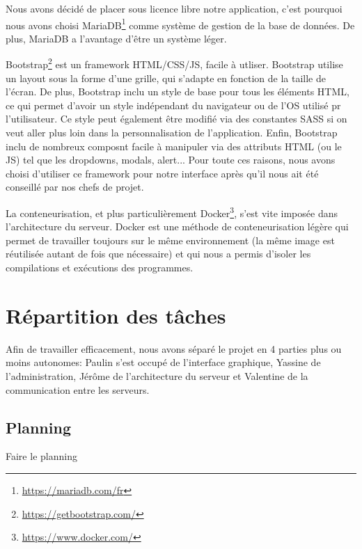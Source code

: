 \par Nous avons décidé de placer sous licence libre notre application, c'est pourquoi nous avons choisi MariaDB\footnote{\url{https://mariadb.com/fr}} comme système de gestion de la base de données. De plus, MariaDB a l'avantage d'être un système léger. \\

\par Bootstrap\footnote{\url{https://getbootstrap.com/}} est un framework HTML/CSS/JS, facile à utliser. Bootstrap utilise un layout sous la forme d'une grille, qui s'adapte en fonction de la taille de l'écran. De plus, Bootstrap inclu un style de base pour tous les éléments HTML, ce qui permet d'avoir un style indépendant du navigateur ou de l'OS utilisé pr l'utilisateur. Ce style peut également être modifié via des constantes SASS si on veut aller plus loin dans la personnalisation de l'application. Enfin, Bootstrap inclu de nombreux composnt facile à manipuler via des attributs HTML (ou le JS) tel que les dropdowns, modals, alert... Pour toute ces raisons, nous avons choisi d'utiliser ce framework pour notre interface après qu'il nous ait été conseillé par nos chefs de projet.

\par La conteneurisation, et plus particulièrement Docker\footnote{\url{https://www.docker.com/}}, s'est vite imposée dans l'architecture du serveur. Docker est une méthode de conteneurisation légère qui permet de travailler toujours sur le même environnement (la même image est réutilisée autant de fois que nécessaire) et qui nous a permis d'isoler les compilations et exécutions des programmes.

\section{Répartition des tâches}

\par Afin de travailler efficacement, nous avons séparé le projet en 4 parties plus ou moins autonomes: Paulin s'est occupé de l'interface graphique, Yassine de l'administration, Jérôme de l'architecture du serveur et Valentine de la communication entre les serveurs.

\subsection{Planning}

Faire le planning

